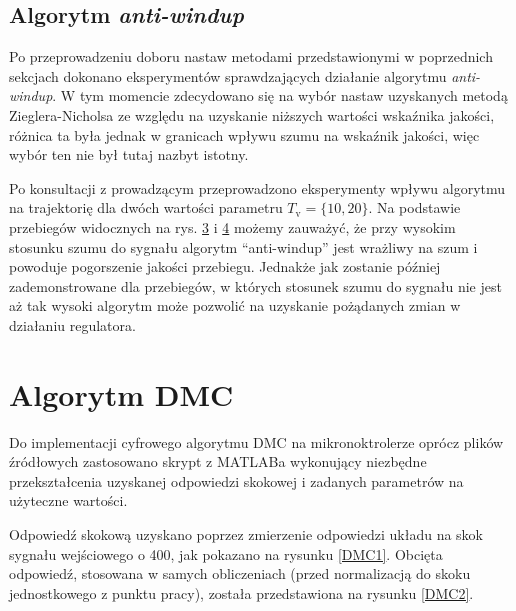 \begin{figure}[H]
\centering

\label{R9}
\end{figure}

\begin{figure}[H]
\centering

\label{R10}
\end{figure}

\section{Algorytm \textit{anti-windup}}
Po przeprowadzeniu doboru nastaw metodami przedstawionymi w poprzednich sekcjach dokonano eksperymentów sprawdzających działanie algorytmu \textit{anti-windup}. W tym momencie zdecydowano się na wybór nastaw uzyskanych metodą Zieglera-Nicholsa ze względu na uzyskanie niższych wartości wskaźnika jakości, różnica ta była jednak w granicach wpływu szumu na wskaźnik jakości, więc wybór ten nie był tutaj nazbyt istotny.

Po konsultacji z prowadzącym przeprowadzono eksperymenty wpływu algorytmu na trajektorię dla dwóch wartości parametru $T_\mathrm{v} = \{10, 20\}$. Na podstawie przebiegów widocznych na rys. \ref{R11} i \ref{R12} możemy zauważyć, że przy wysokim stosunku szumu do sygnału algorytm ``anti-windup'' jest wrażliwy na szum i powoduje pogorszenie jakości przebiegu. Jednakże jak zostanie później zademonstrowane dla przebiegów, w których stosunek szumu do sygnału nie jest aż tak wysoki algorytm może pozwolić na uzyskanie pożądanych zmian w działaniu regulatora.

\begin{figure}[H]
\centering

\label{R11}
\end{figure}

\begin{figure}[H]
\centering

\label{R12}
\end{figure}


\chapter{Algorytm DMC}

Do implementacji cyfrowego algorytmu DMC na mikronoktrolerze oprócz plików źródłowych zastosowano skrypt z MATLABa wykonujący niezbędne przekształcenia uzyskanej odpowiedzi skokowej i zadanych parametrów na użyteczne wartości.

Odpowiedź skokową uzyskano poprzez zmierzenie odpowiedzi układu na skok sygnału wejściowego o 400, jak pokazano na rysunku \ref{DMC1}. Obcięta odpowiedź, stosowana w samych obliczeniach (przed normalizacją do skoku jednostkowego z punktu pracy), została przedstawiona na rysunku \ref{DMC2}.


